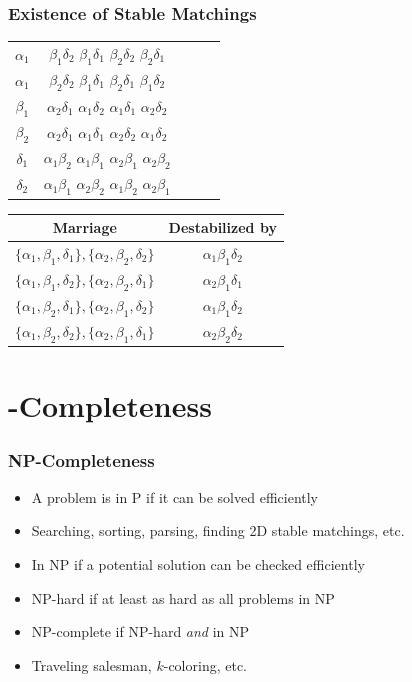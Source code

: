 \documentclass[mathserif,serif]{beamer}
\begin{document}
\begin{frame}
  \frametitle{Existence of Stable Matchings}

    \begin{center}
      \begin{tabular}{c | c c c c}
        $\alpha_1$ & $\beta_1\delta_2$ $\beta_1\delta_1$ $\beta_2\delta_2$ $\beta_2\delta_1$ \\
        $\alpha_1$ & $\beta_2\delta_2$ $\beta_1\delta_1$ $\beta_2\delta_1$ $\beta_1\delta_2$ \\ \hline
        $\beta_1$ & $\alpha_2\delta_1$ $\alpha_1\delta_2$ $\alpha_1\delta_1$ $\alpha_2\delta_2$ \\
        $\beta_2$ & $\alpha_2\delta_1$ $\alpha_1\delta_1$ $\alpha_2\delta_2$ $\alpha_1\delta_2$ \\ \hline
        $\delta_1$ & $\alpha_1\beta_2$ $\alpha_1\beta_1$ $\alpha_2\beta_1$ $\alpha_2\beta_2$ \\
        $\delta_2$ & $\alpha_1\beta_1$ $\alpha_2\beta_2$ $\alpha_1\beta_2$ $\alpha_2\beta_1$ \\
      \end{tabular}
      \begin{tabular}{c | c}
        Marriage & Destabilized by \\ \hline
        $\{\alpha_1, \beta_1, \delta_1\}, \{\alpha_2, \beta_2, \delta_2\}$ & $\alpha_1\beta_1\delta_2$ \\
        $\{\alpha_1, \beta_1, \delta_2\}, \{\alpha_2, \beta_2, \delta_1\}$ & $\alpha_2\beta_1\delta_1$ \\
        $\{\alpha_1, \beta_2, \delta_1\}, \{\alpha_2, \beta_1, \delta_2\}$ & $\alpha_1\beta_1\delta_2$ \\
        $\{\alpha_1, \beta_2, \delta_2\}, \{\alpha_2, \beta_1, \delta_1\}$ & $\alpha_2\beta_2\delta_2$ \\
      \end{tabular}
    \end{center}
\end{frame}

\section{\NP-Completeness}

\begin{frame}
  \frametitle{NP-Completeness}
  \begin{itemize}
  \item A problem is in P if it can be solved efficiently
  \item Searching, sorting, parsing, finding 2D stable matchings, etc.
  \item In NP if a potential solution can be checked efficiently
  \item NP-hard if at least as hard as all problems in NP
  \item NP-complete if NP-hard \emph{and} in NP
  \item Traveling salesman, $k$-coloring, etc.
  \end{itemize}
\end{frame}
\end{document}
